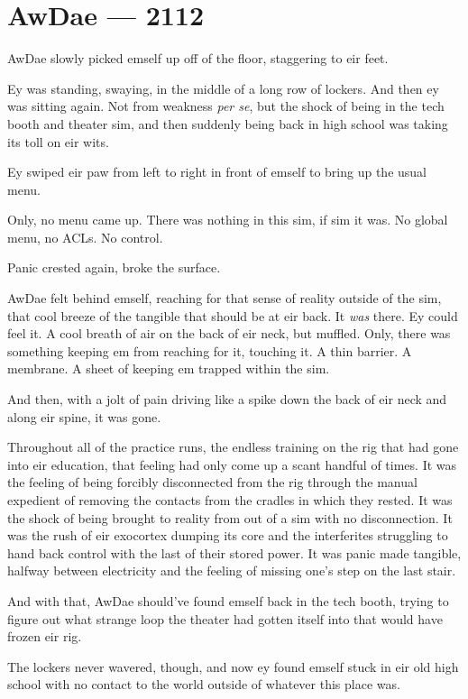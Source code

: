 \hypertarget{rj-brewster-2112}{%
\chapter*{AwDae — 2112}\label{rj-brewster-2112}}

AwDae slowly picked emself up off of the floor, staggering to eir feet.

Ey was standing, swaying, in the middle of a long row of lockers. And then ey was sitting again. Not from weakness \emph{per se}, but the shock of being in the tech booth and theater sim, and then suddenly being back in high school was taking its toll on eir wits.

Ey swiped eir paw from left to right in front of emself to bring up the usual menu.

Only, no menu came up. There was nothing in this sim, if sim it was. No global menu, no ACLs. No control.

Panic crested again, broke the surface.

AwDae felt behind emself, reaching for that sense of reality outside of the sim, that cool breeze of the tangible that should be at eir back. It \emph{was} there. Ey could feel it. A cool breath of air on the back of eir neck, but muffled. Only, there was something keeping em from reaching for it, touching it. A thin barrier. A membrane. A sheet of keeping em trapped within the sim.

And then, with a jolt of pain driving like a spike down the back of eir neck and along eir spine, it was gone.

Throughout all of the practice runs, the endless training on the rig that had gone into eir education, that feeling had only come up a scant handful of times. It was the feeling of being forcibly disconnected from the rig through the manual expedient of removing the contacts from the cradles in which they rested. It was the shock of being brought to reality from out of a sim with no disconnection. It was the rush of eir exocortex dumping its core and the interferites struggling to hand back control with the last of their stored power. It was panic made tangible, halfway between electricity and the feeling of missing one's step on the last stair.

And with that, AwDae should've found emself back in the tech booth, trying to figure out what strange loop the theater had gotten itself into that would have frozen eir rig.

The lockers never wavered, though, and now ey found emself stuck in eir old high school with no contact to the world outside of whatever this place was.


